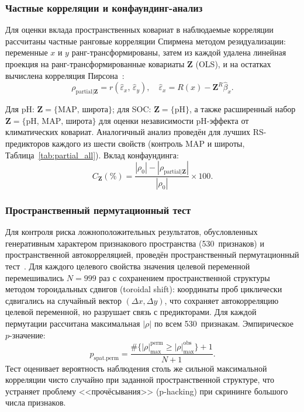 \subsubsection{Частные корреляции и конфаундинг-анализ}
\label{sec:confounding_method}

Для оценки вклада пространственных ковариат в наблюдаемые корреляции рассчитаны частные ранговые корреляции Спирмена методом резидуализации: переменные $x$ и $y$ ранг-трансформированы, затем из каждой удалена линейная проекция на ранг-трансформированные ковариаты $\mathbf{Z}$ (OLS), и на остатках вычислена корреляция Пирсона~\citep{Conover1999}:
\begin{equation}
\rho_{\text{partial}|\mathbf{Z}} = r(\hat{\varepsilon}_x,\, \hat{\varepsilon}_y), \quad
\hat{\varepsilon}_x = R(x) - \mathbf{Z}^{R}\hat{\beta}_x.
\end{equation}

Для pH: $\mathbf{Z} = \{\text{MAP},\, \text{широта}\}$; для SOC: $\mathbf{Z} = \{\text{pH}\}$, а также расширенный набор $\mathbf{Z} = \{\text{pH},\, \text{MAP},\, \text{широта}\}$ для оценки независимости pH-эффекта от климатических ковариат. Аналогичный анализ проведён для лучших RS-предикторов каждого из шести свойств (контроль MAP и широты, Таблица~\ref{tab:partial_all}). Вклад конфаундинга:
\begin{equation}
C_{\mathbf{Z}} (\%) = \frac{|\rho_0| - |\rho_{\text{partial}|\mathbf{Z}}|}{|\rho_0|} \times 100.
\end{equation}

\subsubsection{Пространственный пермутационный тест}
\label{sec:spatial_permutation}

Для контроля риска ложноположительных результатов, обусловленных генеративным характером признакового пространства (530~признаков) и пространственной автокорреляцией, проведён пространственный пермутационный тест~\citep{Legendre2012}. Для каждого целевого свойства значения целевой переменной перемешивались $N = 999$ раз с сохранением пространственной структуры методом тороидальных сдвигов (toroidal shift): координаты проб циклически сдвигались на случайный вектор $(\Delta x, \Delta y)$, что сохраняет автокорреляцию целевой переменной, но разрушает связь с предикторами. Для каждой пермутации рассчитана максимальная $|\rho|$ по всем 530~признакам. Эмпирическое $p$-значение:
\begin{equation}
p_{\text{spat.perm}} = \frac{\#\{|\rho|_{\max}^{\text{perm}} \geq |\rho|_{\max}^{\text{obs}}\} + 1}{N + 1}.
\end{equation}
Тест оценивает вероятность наблюдения столь же сильной максимальной корреляции чисто случайно при заданной пространственной структуре, что устраняет проблему <<прочёсывания>> (p-hacking) при скрининге большого числа признаков.

